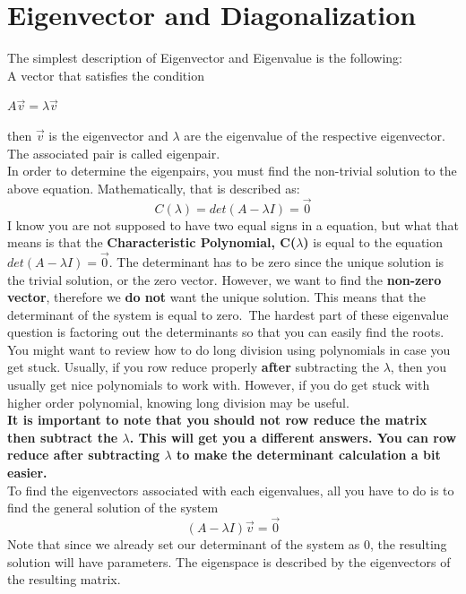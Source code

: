 \documentclass[12pt]{article}
\begin{document}
\section{Eigenvector and Diagonalization}
The simplest description of Eigenvector and Eigenvalue is the following:\\
A vector that satisfies the condition \\
\begin{center}
$A\vec{v} = \lambda\vec{v}$
\end{center}
then $\vec{v}$ is the eigenvector and $\lambda$ are the eigenvalue of the respective eigenvector. The associated pair is called eigenpair.\\
In order to determine the eigenpairs, you must find the non-trivial solution to the above equation.
Mathematically, that is described as:
\begin{equation}
C(\lambda) = det(A-\lambda I) = \vec{0}
\end{equation}
I know you are not supposed to have two equal signs in a equation, but what that means is that the \textbf{Characteristic Polynomial, C($\lambda$)} is equal to the equation $det(A-\lambda I) = \vec{0}$. The determinant has to be zero since the unique solution is the trivial solution, or the zero vector. However, we want to find the \textbf{non-zero vector}, therefore we \textbf{do not} want the unique solution. This means that the determinant of the system is equal to zero.\
The hardest part of these eigenvalue question is factoring out the determinants so that you can easily find the roots. You might want to review how to do long division using polynomials in case you get stuck. Usually, if you row reduce properly \textbf{after} subtracting the $\lambda$, then you usually get nice polynomials to work with. However, if you do get stuck with higher order polynomial, knowing long division may be useful.\\
\textbf{It is important to note that you should not row reduce the matrix then subtract the $\lambda$. This will get you a different answers. You can row reduce after subtracting $\lambda$ to make the determinant calculation a bit easier.}\\
To find the eigenvectors associated with each eigenvalues, all you have to do is to find the general solution of the system \\
\begin{equation}
(A-\lambda I)\vec{v}= \vec{0}
\end{equation}
Note that since we already set our determinant of the system as 0, the resulting solution will have parameters. The eigenspace is described by the eigenvectors of the resulting matrix.\\
\end{document}
